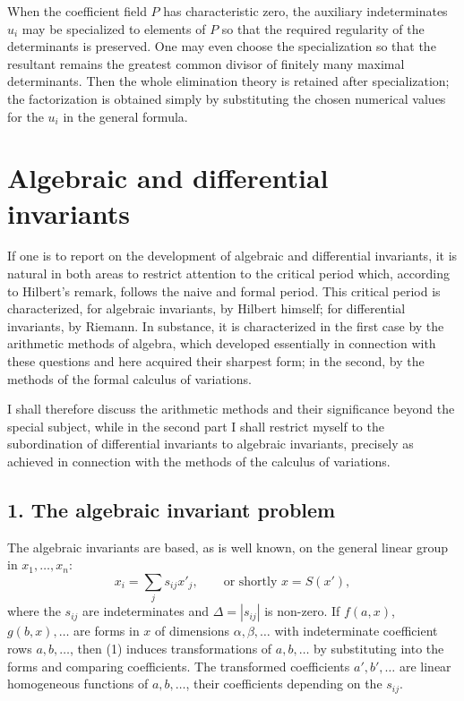 \documentclass[12pt]{article}
\begin{document}
When the coefficient field $P$ has characteristic zero, the auxiliary indeterminates $u_i$ may be specialized to elements of $P$ so that the required regularity of the determinants is preserved. One may even choose the specialization so that the resultant remains the greatest common divisor of finitely many maximal determinants. Then the whole elimination theory is retained after specialization; the factorization is obtained simply by substituting the chosen numerical values for the $u_i$ in the general formula.

\newpage

\section{Algebraic and differential invariants}

If one is to report on the development of algebraic and differential invariants, it is natural in both areas to restrict attention to the critical period which, according to Hilbert's remark, follows the naive and formal period. This critical period is characterized, for algebraic invariants, by Hilbert himself; for differential invariants, by Riemann. In substance, it is characterized in the first case by the arithmetic methods of algebra, which developed essentially in connection with these questions and here acquired their sharpest form; in the second, by the methods of the formal calculus of variations.

I shall therefore discuss the arithmetic methods and their significance beyond the special subject, while in the second part I shall restrict myself to the subordination of differential invariants to algebraic invariants, precisely as achieved in connection with the methods of the calculus of variations.

\subsection{1. The algebraic invariant problem}

The algebraic invariants are based, as is well known, on the general linear group in $x_1,\ldots,x_n$:
\begin{equation}
  x_i=\sum_j s_{ij}x'_j, \qquad \text{or shortly } x=S(x'),          \tag{1}
\end{equation}
where the $s_{ij}$ are indeterminates and $\Delta=|s_{ij}|$ is non-zero. If $f(a,x)$, $g(b,x),\ldots$ are forms in $x$ of dimensions $\alpha,\beta,\ldots$ with indeterminate coefficient rows $a,b,\ldots$, then (1) induces transformations of $a,b,\ldots$ by substituting into the forms and comparing coefficients. The transformed coefficients $a',b',\ldots$ are linear homogeneous functions of $a,b,\ldots$, their coefficients depending on the $s_{ij}$.
\end{document}
